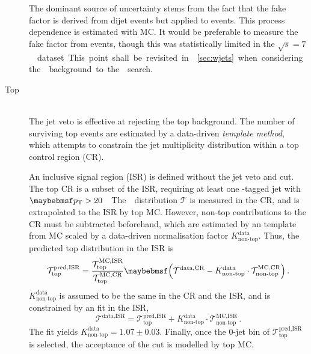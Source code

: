 \begin{description}
	The dominant source of uncertainty stems from the fact that the fake factor is 
	derived from dijet events but applied to \Wjets events. This process dependence is 
	estimated with MC. It would be preferable to measure the fake factor from \Zjets 
	events, though this was statistically limited in the \unit{$\sqrt{s} = 7$}{\TeV} 
	dataset. This point shall be revisited in \Section~\ref{sec:wjets} when considering 
	the \Wjets background to the \HWW search.


\item[Top] \hfill \\
	The jet veto is effective at rejecting the top background. The number of surviving 
	top events are estimated by a data-driven \textit{template method}, which attempts to 
	constrain the jet multiplicity distribution within a top control region (CR).

	An inclusive signal region (ISR) is defined without the jet veto and \ptll cut. The 
	top CR is a subset of the ISR, requiring at least one \Pbottom-tagged jet with 
	\unit{$\pt > 20$}{\GeV}. The \njets distribution $\mathcal{T}$ is measured in the CR, 
	and is extrapolated to the ISR by top MC. However, non-top contributions to the CR 
	must be subtracted beforehand, which are estimated by an \njets template from MC 
	scaled by a data-driven normalisation factor $K_{\text{non-top}}^{\text{data}}$. 
	Thus, the predicted top \njets distribution in the ISR is
	\begin{equation}
		\mathcal{T}_{\text{top}}^{\text{pred,ISR}} = \frac{\mathcal{T}_{\text{top}}^{\text{MC,ISR}}}{\mathcal{T}_{\text{top}}^{\text{MC,CR}}} \parenths{\mathcal{T}^{\text{data,CR}} - K_{\text{non-top}}^{\text{data}} \cdot \mathcal{T}_{\text{non-top}}^{\text{MC,CR}}} \,.
	\end{equation}
	$K_{\text{non-top}}^{\text{data}}$ is assumed to be the same in the CR and the ISR, 
	and is constrained by an \njets fit in the ISR, \ie
	\begin{equation}
		\mathcal{T}^{\text{data,ISR}} = \mathcal{T}_{\text{top}}^{\text{pred,ISR}} + K_{\text{non-top}}^{\text{data}} \cdot \mathcal{T}_{\text{non-top}}^{\text{MC,ISR}} \,.
	\end{equation}
	The fit yields $K_{\text{non-top}}^{\text{data}} = 1.07 \pm 0.03$.
	Finally, once the 0-jet bin of $\mathcal{T}_{\text{top}}^{\text{pred,ISR}}$ is 
	selected, the acceptance of the \ptll cut is modelled by top MC.


\end{description}
